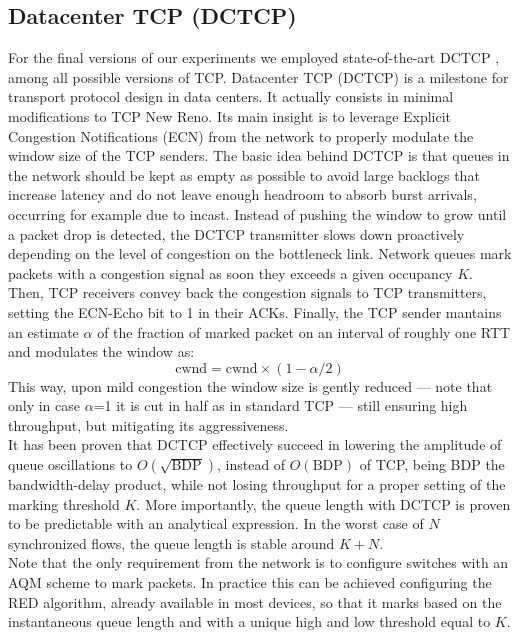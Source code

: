 \subsection{Datacenter TCP (DCTCP)}
\label{sec:dctcp}
For the final versions of our experiments we employed state-of-the-art DCTCP \cite{dctcp}, among all possible versions of TCP.
Datacenter TCP (DCTCP) is a milestone for transport protocol design in data centers. It actually consists in minimal modifications to TCP New Reno. Its main insight is to leverage Explicit Congestion Notifications (ECN) from the network to properly modulate the window size of the TCP senders. The basic idea behind DCTCP is that queues in the network should be kept as empty as possible to avoid large backlogs that increase latency and do not leave enough headroom to absorb burst arrivals, occurring for example due to incast. Instead of pushing the window to grow until a packet drop is detected, the DCTCP transmitter slows down proactively depending on the level of congestion on the bottleneck link. Network queues mark packets with a congestion signal as soon they exceeds a given occupancy $K$. Then, TCP receivers convey back the congestion signals to TCP transmitters, setting the ECN-Echo bit to 1 in their ACKs. Finally, the TCP sender mantains an estimate $\alpha$ of the fraction of marked packet on an interval of roughly one RTT and modulates the window as:
\[ \text{cwnd} = \text{cwnd} \times (1-\alpha/2)\]
This way, upon mild congestion the window size is gently reduced --- note that only in case $\alpha$=1 it is cut in half as in standard TCP --- still ensuring high throughput, but mitigating its aggressiveness.\\It has been proven that DCTCP effectively succeed in lowering the amplitude of queue oscillations to $O(\sqrt{\text{BDP}})$, instead of $O(\text{BDP})$ of TCP, being BDP the bandwidth-delay product, while not losing throughput for a proper setting of the marking threshold $K$. More importantly, the queue length with DCTCP is proven to be predictable with an analytical expression. In the worst case of $N$ synchronized flows, the queue length is stable around $K+N$. \\
Note that the only requirement from the network is to configure switches with an AQM scheme to mark packets. In practice this can be achieved configuring the RED algorithm, already available in most devices, so that it marks based on the instantaneous queue length and with a unique high and low threshold equal to $K$. 
